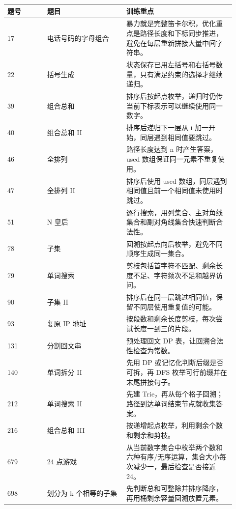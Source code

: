 \begin{longtable}{@{}p{0.16\linewidth}p{0.32\linewidth}p{0.44\linewidth}@{}}
\toprule
题号 & 题目 & 训练重点\\
\midrule
\endhead
17 & 电话号码的字母组合 & 暴力就是完整笛卡尔积，优化重点是路径长度和下标同步推进，避免在每层重新拼接大量中间字符串。\\
22 & 括号生成 & 状态保存已用左括号和右括号数量，只有满足约束的选择才继续递归。\\
39 & 组合总和 & 排序后按起点枚举，递归时仍传当前下标表示可以继续使用同一数字。\\
40 & 组合总和 II & 排序后递归下一层从 i 加一开始，同层遇到相同值要跳过。\\
46 & 全排列 & 路径长度达到 n 时产生答案，used 数组保证同一元素不重复使用。\\
47 & 全排列 II & 排序后使用 used 数组，同层遇到相同值且前一个相同值未使用时跳过。\\
51 & N 皇后 & 逐行搜索，用列集合、主对角线集合和副对角线集合快速判断合法性。\\
78 & 子集 & 回溯按起点向后枚举，避免不同顺序生成同一集合。\\
79 & 单词搜索 & 剪枝包括首字符不匹配、剩余长度不足、字符频次不足和越界访问。\\
90 & 子集 II & 排序后在同一层跳过相同值，保留不同层使用重复值的可能。\\
93 & 复原 IP 地址 & 按段数和剩余长度剪枝，每次尝试长度一到三的片段。\\
131 & 分割回文串 & 预处理回文 DP 表，让回溯合法性检查为常数。\\
140 & 单词拆分 II & 先用 DP 或记忆化判断后缀是否可拆，再 DFS 枚举可行前缀并在末尾拼接句子。\\
212 & 单词搜索 II & 先建 Trie，再从每个格子回溯；路径到达单词结束节点就收集答案。\\
216 & 组合总和 III & 按递增起点枚举，利用剩余个数和剩余和剪枝。\\
679 & 24 点游戏 & 从当前数字集合中枚举两个数和六种有序/无序运算，集合大小每次减少一，最后检查是否接近 24。\\
698 & 划分为 k 个相等的子集 & 先判断总和可整除并排序降序，再用桶剩余容量回溯放置元素。\\
\bottomrule
\end{longtable}


